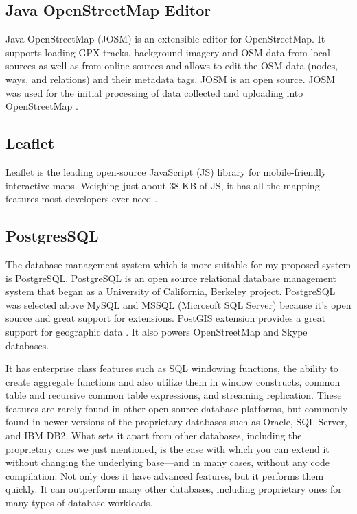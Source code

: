 \subsection{Java OpenStreetMap Editor}
Java OpenStreetMap (JOSM) is an extensible editor for OpenStreetMap. It supports loading GPX tracks, background imagery and OSM data from local sources as well as from online sources and allows to edit the OSM data (nodes, ways, and relations) and their metadata tags. JOSM is an open source. JOSM was used for the initial processing of data collected and uploading into OpenStreetMap \citep{ciepluch2009using}.

\subsection{Leaflet}
Leaflet is the leading open-source JavaScript (JS) library for mobile-friendly interactive maps. Weighing just about 38 KB of JS, it has all the mapping features most developers ever need \citep{cheng2017leaflet}.

\subsection{PostgresSQL}
The database management system which is more suitable for my proposed system is PostgreSQL. PostgreSQL is an open source relational database management system that began as a University of California, Berkeley project. PostgreSQL was selected above MySQL and MSSQL (Microsoft SQL Server) because it's open source and great support for extensions. PostGIS extension provides a great support for geographic data \citep{obe2011postgis}. It also powers OpenStreetMap and Skype databases.

It has enterprise class features such as SQL windowing functions, the ability to create aggregate functions and also utilize them in window constructs, common table and
recursive common table expressions, and streaming replication. These features are rarely found in other open source database platforms, but commonly found in newer versions of the proprietary databases such as Oracle, SQL Server, and IBM DB2. What sets it apart from other databases, including the proprietary ones we just mentioned,
is the ease with which you can extend it without changing the underlying base—and in many cases, without any code compilation. Not only does it have advanced features,
but it performs them quickly. It can outperform many other databases, including proprietary ones for many types of database workloads.




